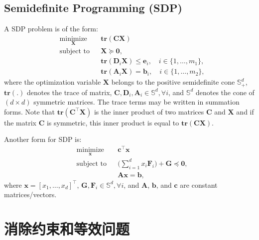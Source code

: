 \documentclass[lang=cn,10pt]{gorgeousnbook}
\numberwithin{equation}{section}%
\numberwithin{figure}{section}%
\begin{document}
\subsection{Semidefinite Programming (SDP)}

A SDP problem is of the form:
\begin{equation}
\begin{aligned}
& \underset{\boldsymbol{X}}{\text{minimize}}
& & \textbf{tr}(\boldsymbol{C} \boldsymbol{X}) \\
& \text{subject to}
& & \boldsymbol{X} \succeq \boldsymbol{0}, \\
& & & \textbf{tr}(\boldsymbol{D}_i \boldsymbol{X}) \leq \boldsymbol{e}_i, \quad i \in \{1, \dots, m_1\}, \\
& & & \textbf{tr}(\boldsymbol{A}_i \boldsymbol{X}) = \boldsymbol{b}_i, \quad i \in \{1, \dots, m_2\}, 
\end{aligned}
\end{equation}
where the optimization variable $\boldsymbol{X}$ belongs to the positive semidefinite cone $\mathbb{S}_+^d$, $\textbf{tr}(.)$ denotes the trace of matrix, $\boldsymbol{C}, \boldsymbol{D}_i, \boldsymbol{A}_i \in \mathbb{S}^d, \forall i$, and $\mathbb{S}^d$ denotes the cone of $(d \times d)$ symmetric matrices. 
The trace terms may be written in summation forms.
Note that $\textbf{tr}(\boldsymbol{C}^\top \boldsymbol{X})$ is the inner product of two matrices $\boldsymbol{C}$ and $\boldsymbol{X}$ and if the matrix $\boldsymbol{C}$ is symmetric, this inner product is equal to $\textbf{tr}(\boldsymbol{C} \boldsymbol{X})$.  

Another form for SDP is: 
\begin{equation}
\begin{aligned}
& \underset{\boldsymbol{x}}{\text{minimize}}
& & \boldsymbol{c}^\top \boldsymbol{x} \\
& \text{subject to}
& & \Big(\sum_{i=1}^d x_i \boldsymbol{F}_i\Big) + \boldsymbol{G} \preceq \boldsymbol{0}, \\
& & & \boldsymbol{Ax} = \boldsymbol{b},
\end{aligned}
\end{equation}
where $\boldsymbol{x} = [x_1, \dots, x_d]^\top$, $\boldsymbol{G}, \boldsymbol{F}_i \in \mathbb{S}^d, \forall i$, and $\boldsymbol{A}$, $\boldsymbol{b}$, and $\boldsymbol{c}$ are constant matrices/vectors.

\section{消除约束和等效问题}
\end{document}

